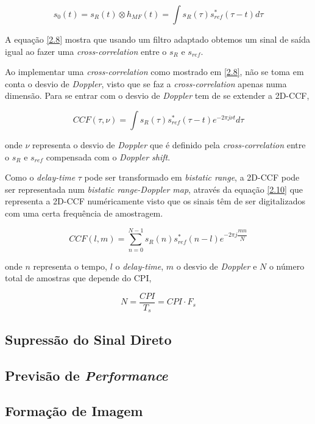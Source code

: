 \begin{equation} \label{2.8}
s_{0}\left( t\right) =s_{R}\left( t\right)\otimes h_{MF}\left( t\right) =\int s_{R}\left( \tau\right)s_{ref}^{\ast}\left(\tau -t\right)d\tau
\end{equation}

A equação \ref{2.8} mostra que usando um filtro adaptado obtemos um sinal de saída igual ao fazer uma \textit{cross-correlation} entre o $s_{R}$ e $s_{ref}$.\par 

Ao implementar uma \textit{cross-correlation} como mostrado em \ref{2.8}, não se toma em conta o desvio de \textit{Doppler}, visto que se faz a \textit{cross-correlation} apenas numa dimensão. Para se entrar com o desvio de \textit{Doppler} tem de se extender a \gls{2D-CCF},

\begin{equation} \label{2.9}
CCF\left( \tau,\nu\right) =\int s_{R}\left( \tau\right)s_{ref}^{\ast}\left(\tau -t\right)e^{-2\pi j\nu t}d\tau
\end{equation}

onde $\nu$ representa o desvio de \textit{Doppler} que é definido pela \textit{cross-correlation} entre o $s_{R}$ e $s_{ref}$ compensada com o \textit{Doppler shift}.\par
Como o \textit{delay-time} $\tau$ pode ser transformado em \textit{bistatic range}, a \gls{2D-CCF} pode ser representada num \textit{bistatic range-Doppler map}, através da equação \ref{2.10} que representa a \gls{2D-CCF} numéricamente visto que os sinais têm de ser digitalizados com uma certa frequência de amostragem.

\begin{equation} \label{2.10}
CCF\left(l,m\right) =\sum_{n=0}^{N-1} s_{R}\left( n\right)s_{ref}^{\ast}\left(n -l\right)e^{-2\pi j\dfrac{mn}{N}}
\end{equation}

onde $n$ representa o tempo, $l$ o \textit{delay-time}, $m$ o desvio de \textit{Doppler} e $N$ o número total de amostras que depende do \gls{CPI},

\begin{equation} \label{2.11}
N=\dfrac{CPI}{T_{s}}=CPI\cdot F_{s}
\end{equation}


\subsection{Supressão do Sinal Direto}




\subsection{Previsão de \textit{Performance}}



\subsection{Formação de Imagem}

